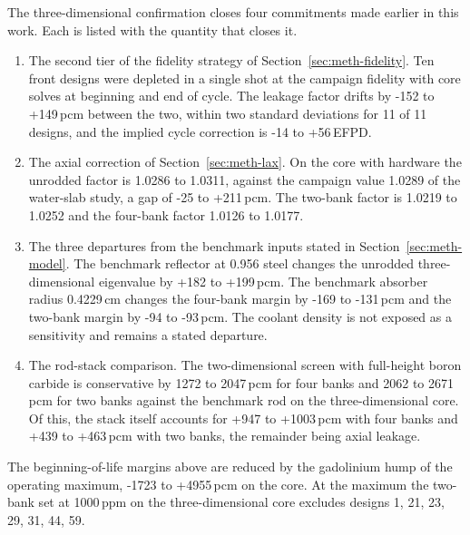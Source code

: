 
The three-dimensional confirmation closes four commitments made earlier
in this work. Each is listed with the quantity that closes it.

\begin{enumerate}
  \item The second tier of the fidelity strategy of Section~\ref{sec:meth-fidelity}. Ten front designs were depleted in a single shot at the campaign fidelity with core solves at beginning and end of cycle. The leakage factor drifts by -152 to +149\,pcm between the two, within two standard deviations for 11 of 11 designs, and the implied cycle correction is -14 to +56\,EFPD.
  \item The axial correction of Section~\ref{sec:meth-lax}. On the core with hardware the unrodded factor is 1.0286 to 1.0311, against the campaign value 1.0289 of the water-slab study, a gap of -25 to +211\,pcm. The two-bank factor is 1.0219 to 1.0252 and the four-bank factor 1.0126 to 1.0177.
  \item The three departures from the benchmark inputs stated in Section~\ref{sec:meth-model}. The benchmark reflector at 0.956 steel changes the unrodded three-dimensional eigenvalue by +182 to +199\,pcm. The benchmark absorber radius 0.4229\,cm changes the four-bank margin by -169 to -131\,pcm and the two-bank margin by -94 to -93\,pcm. The coolant density is not exposed as a sensitivity and remains a stated departure.
  \item The rod-stack comparison. The two-dimensional screen with full-height boron carbide is conservative by 1272 to 2047\,pcm for four banks and 2062 to 2671\,pcm for two banks against the benchmark rod on the three-dimensional core. Of this, the stack itself accounts for +947 to +1003\,pcm with four banks and +439 to +463\,pcm with two banks, the remainder being axial leakage.
\end{enumerate}

The beginning-of-life margins above are reduced by the gadolinium hump of the operating maximum, -1723 to +4955\,pcm on the core. At the maximum the two-bank set at 1000\,ppm on the three-dimensional core excludes designs 1, 21, 23, 29, 31, 44, 59. %
